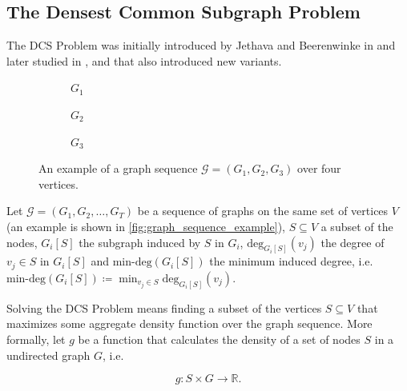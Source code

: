 \subsection{The Densest Common Subgraph Problem}%
\label{sub:the_common_densest_subgraph_problem}

The \acrfull{DCS} Problem was initially introduced by Jethava and Beerenwinke
in \cite{jethava2015finding}
and later studied in \cite{andersson2016finding}, \cite{charikar2018finding}
and \cite{semertzidis2019finding} that also introduced new variants.

\begin{figure}
	\begin{center}
		\begin{subfigure}[b]{0.3\textwidth}
			\centering
			\caption{$G_1$}
			\label{fig:graph_sequence_example1}
		\end{subfigure}
		\begin{subfigure}[b]{0.3\textwidth}
			\centering
			\caption{$G_2$}
			\label{fig:graph_sequence_example2}
		\end{subfigure}
		\begin{subfigure}[b]{0.3\textwidth}
			\centering
			\caption{$G_3$}
			\label{fig:graph_sequence_example3}
		\end{subfigure}
	\end{center}
	\caption[Example sequence graph]{An example of a graph sequence
		$\mathcal{G} = (G_1, G_2, G_3) $ over four vertices.}
	\label{fig:graph_sequence_example}
\end{figure}

Let $\mathcal{G} = (G_1, G_2, \dots, G_T) $ be a sequence of graphs on the same
set of vertices $V$ (an example is shown in
\autoref{fig:graph_sequence_example}), $S \subseteq V$ a
subset of the nodes, $G_i[S]$ the subgraph induced by $S$ in $G_i$,
$\text{deg}_{G_i[S]} (v_{j} )$ the degree of $v_{j} \in S$ in $G_i[S]$ and
$\text{min-deg}(G_i[S])$ the minimum induced degree, i.e.
$\text{min-deg}(G_i[S]) \coloneqq \min _{v_{j}  \in S} \text{deg} _{G_i[S]}
	(v_{j}) $.

Solving the \acrlong{DCS} Problem means finding a subset
of the vertices $S \subseteq V$ that maximizes some aggregate density function
over the graph sequence. More formally, let $g$ be a
function that calculates the density of a set of nodes $S$ in a undirected
graph $G$, i.e.\

\begin{equation*}
	g: S \times G \rightarrow \mathbb{R}.
\end{equation*}

